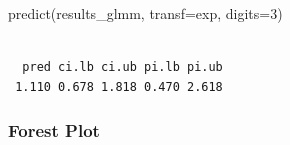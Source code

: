 \documentclass[
  letterpaper,
  DIV=11,
  numbers=noendperiod]{scrartcl}
\newenvironment{Shaded}{\begin{snugshade}}{\end{snugshade}}
\newcommand{\AttributeTok}[1]{\textcolor[rgb]{0.40,0.45,0.13}{#1}}
\newcommand{\DecValTok}[1]{\textcolor[rgb]{0.68,0.00,0.00}{#1}}
\newcommand{\FunctionTok}[1]{\textcolor[rgb]{0.28,0.35,0.67}{#1}}
\newcommand{\NormalTok}[1]{\textcolor[rgb]{0.00,0.23,0.31}{#1}}
\begin{document}
\begin{Shaded}
\begin{Highlighting}[]
\FunctionTok{predict}\NormalTok{(results\_glmm, }\AttributeTok{transf=}\NormalTok{exp, }\AttributeTok{digits=}\DecValTok{3}\NormalTok{)}
\end{Highlighting}
\end{Shaded}

\begin{verbatim}

  pred ci.lb ci.ub pi.lb pi.ub 
 1.110 0.678 1.818 0.470 2.618 
\end{verbatim}

\subsubsection{Forest Plot}\label{forest-plot-1}
\end{document}
